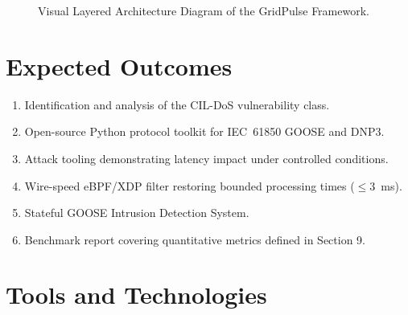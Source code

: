 \documentclass[12pt,a4paper]{article}
\begin{document}
\begin{figure}[H]
\caption{Visual Layered Architecture Diagram of the GridPulse Framework.}
\label{fig:layered_arch}
\end{figure}

\section{Expected Outcomes}

\begin{enumerate}[noitemsep]
  \item Identification and analysis of the CIL-DoS vulnerability class.
  \item Open-source Python protocol toolkit for IEC~61850 GOOSE and DNP3.
  \item Attack tooling demonstrating latency impact under controlled conditions.
  \item Wire-speed eBPF/XDP filter restoring bounded processing times ($\le 3$~ms).
  \item Stateful GOOSE Intrusion Detection System.
  \item Benchmark report covering quantitative metrics defined in Section 9.
\end{enumerate}

\section{Tools and Technologies}
\end{document}
